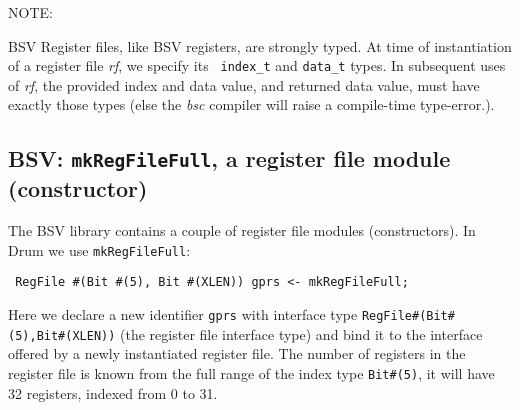 \vspace{2ex}

NOTE:

\vspace{2ex}

BSV Register files, like BSV registers, are strongly typed.  At time
of instantiation of a register file \emph{rf}, we specify its {\tt
index\_t} and {\tt data\_t} types.  In subsequent uses of \emph{rf},
the provided index and data value, and returned data value, must have
exactly those types (else the \emph{bsc} compiler will raise a
compile-time type-error.).


\subsection{BSV: {\tt mkRegFileFull}, a register file module (constructor)}


The BSV library contains a couple of register file modules
(constructors). In Drum we use {\tt mkRegFileFull}:


\begin{tabbing}\small\tt
\hmm RegFile \#(Bit \#(5), Bit \#(XLEN)) gprs <- mkRegFileFull;
\end{tabbing}

Here we declare a new identifier \verb|gprs| with interface type
\verb|RegFile#(Bit#(5),Bit#(XLEN))| (the register file interface type)
and bind it to the interface offered by a newly instantiated register
file.  The number of registers in the register file is known from the
full range of the index type \verb|Bit#(5)|, {\ie} it will have 32
registers, indexed from 0 to 31.

